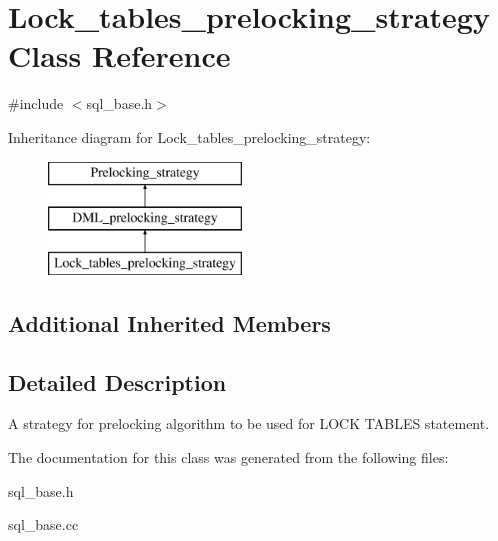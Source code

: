 \hypertarget{classLock__tables__prelocking__strategy}{}\section{Lock\+\_\+tables\+\_\+prelocking\+\_\+strategy Class Reference}
\label{classLock__tables__prelocking__strategy}


{\ttfamily \#include $<$sql\+\_\+base.\+h$>$}

Inheritance diagram for Lock\+\_\+tables\+\_\+prelocking\+\_\+strategy\+:\begin{figure}[H]
\begin{center}
\leavevmode
\includegraphics[height=3.000000cm]{classLock__tables__prelocking__strategy}
\end{center}
\end{figure}
\subsection*{Additional Inherited Members}


\subsection{Detailed Description}
A strategy for prelocking algorithm to be used for L\+O\+CK T\+A\+B\+L\+ES statement. 

The documentation for this class was generated from the following files\+:\begin{DoxyCompactItemize}
\item 
sql\+\_\+base.\+h\item 
sql\+\_\+base.\+cc\end{DoxyCompactItemize}
